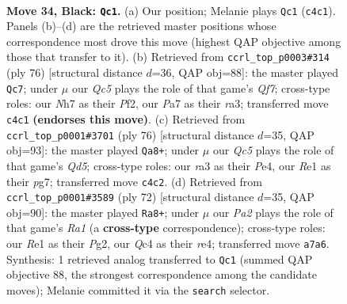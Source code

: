 \documentclass[11pt]{article}
\begin{document}
\clearpage

\begin{figure}[p]\centering
\begin{subfigure}{0.46\textwidth}\centering
\resizebox{\linewidth}{!}{%
\newchessgame
\chessboard[
  setfen={7k/p2p3n/2p2p2/8/1PqP2Q1/R7/5PKP/4r3 b - - 1 34},
  showmover=false,
  pgfstyle=straightmove, color=movearrow, markmove={c4-c1}
]}
\caption{}
\end{subfigure}\hfill
\begin{subfigure}{0.46\textwidth}\centering
\resizebox{\linewidth}{!}{%
\newchessgame
\chessboard[
  setfen={8/5Qpk/4p2p/7P/1P2q3/r5P1/5P2/2R3K1 w - - 0 39},
  showmover=false,
  pgfstyle=straightmove, color=movearrow, markmove={f7-c7}
]}
\caption{}
\end{subfigure}
\\[4pt]
\begin{subfigure}{0.46\textwidth}\centering
\resizebox{\linewidth}{!}{%
\newchessgame
\chessboard[
  setfen={6k1/5pp1/8/p2Qp2p/P3P3/3P4/1P3qPK/8 w - - 8 39},
  showmover=false,
  pgfstyle=straightmove, color=movearrow, markmove={d5-a8}
]}
\caption{}
\end{subfigure}\hfill
\begin{subfigure}{0.46\textwidth}\centering
\resizebox{\linewidth}{!}{%
\newchessgame
\chessboard[
  setfen={6k1/3q1p1p/6p1/3P4/1pQprP2/7P/6PK/R7 w - - 0 37},
  showmover=false,
  pgfstyle=straightmove, color=movearrow, markmove={a1-a8}
]}
\caption{}
\end{subfigure}
\caption{\textbf{Move 34, Black: \texttt{Qc1}.} (a) Our position; Melanie plays \texttt{Qc1} (\texttt{c4c1}). Panels (b)--(d) are the retrieved master positions whose correspondence most drove this move (highest QAP objective among those that transfer to it). (b) Retrieved from \texttt{ccrl\_top\_p0003\#314} (ply 76) [structural distance $d$=36, QAP obj=88]: the master played \texttt{Qc7}; under $\mu$ our \emph{Qc5} plays the role of that game's \emph{Qf7}; cross-type roles: our \emph{N}h7 as their \emph{P}f2, our \emph{P}a7 as their \emph{r}a3; transferred move \texttt{c4c1} \textbf{(endorses this move)}. (c) Retrieved from \texttt{ccrl\_top\_p0001\#3701} (ply 76) [structural distance $d$=35, QAP obj=93]: the master played \texttt{Qa8+}; under $\mu$ our \emph{Qc5} plays the role of that game's \emph{Qd5}; cross-type roles: our \emph{r}a3 as their \emph{P}e4, our \emph{R}e1 as their \emph{p}g7; transferred move \texttt{c4c2}. (d) Retrieved from \texttt{ccrl\_top\_p0001\#3589} (ply 72) [structural distance $d$=35, QAP obj=90]: the master played \texttt{Ra8+}; under $\mu$ our \emph{Pa2} plays the role of that game's \emph{Ra1} (a \textbf{cross-type} correspondence); cross-type roles: our \emph{R}e1 as their \emph{P}g2, our \emph{Q}c4 as their \emph{r}e4; transferred move \texttt{a7a6}. Synthesis: 1 retrieved analog transferred to \texttt{Qc1} (summed QAP objective 88, the strongest correspondence among the candidate moves); Melanie committed it via the \texttt{search} selector.}
\label{fig:thought-m67}
\end{figure}
\end{document}
